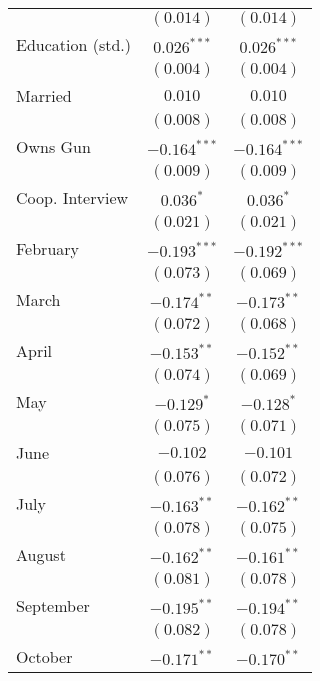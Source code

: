 \begin{table}
\begin{center}
\begin{tabular}{l c c}
                        & $(0.014)$      & $(0.014)$      \\
Education (std.)        & $0.026^{***}$  & $0.026^{***}$  \\
                        & $(0.004)$      & $(0.004)$      \\
Married                 & $0.010$        & $0.010$        \\
                        & $(0.008)$      & $(0.008)$      \\
Owns Gun                & $-0.164^{***}$ & $-0.164^{***}$ \\
                        & $(0.009)$      & $(0.009)$      \\
Coop. Interview         & $0.036^{*}$    & $0.036^{*}$    \\
                        & $(0.021)$      & $(0.021)$      \\
February                & $-0.193^{***}$ & $-0.192^{***}$ \\
                        & $(0.073)$      & $(0.069)$      \\
March                   & $-0.174^{**}$  & $-0.173^{**}$  \\
                        & $(0.072)$      & $(0.068)$      \\
April                   & $-0.153^{**}$  & $-0.152^{**}$  \\
                        & $(0.074)$      & $(0.069)$      \\
May                     & $-0.129^{*}$   & $-0.128^{*}$   \\
                        & $(0.075)$      & $(0.071)$      \\
June                    & $-0.102$       & $-0.101$       \\
                        & $(0.076)$      & $(0.072)$      \\
July                    & $-0.163^{**}$  & $-0.162^{**}$  \\
                        & $(0.078)$      & $(0.075)$      \\
August                  & $-0.162^{**}$  & $-0.161^{**}$  \\
                        & $(0.081)$      & $(0.078)$      \\
September               & $-0.195^{**}$  & $-0.194^{**}$  \\
                        & $(0.082)$      & $(0.078)$      \\
October                 & $-0.171^{**}$  & $-0.170^{**}$  \\

\end{tabular}
\end{center}
\end{table}
